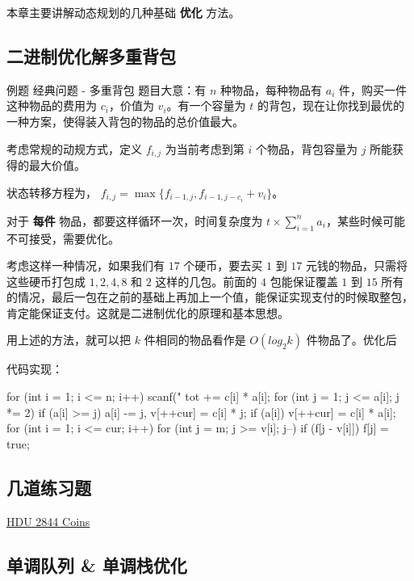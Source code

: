 
本章主要讲解动态规划的几种基础 \textbf{ 优化 } 方法。

\subsection{二进制优化解多重背包}

\begin{NOTE}{例题  经典问题 - 多重背包}{}
题目大意：有 $n$ 种物品，每种物品有 $a_i$ 件，购买一件这种物品的费用为 $c_i$，价值为 $v_i$。有一个容量为 $t$ 的背包，现在让你找到最优的一种方案，使得装入背包的物品的总价值最大。

\end{NOTE}


考虑常规的动规方式，定义 $f_{i,j}$ 为当前考虑到第 $i$ 个物品，背包容量为 $j$ 所能获得的最大价值。

状态转移方程为， $f_{i,j}=\max\{f_{i-1,j},f_{i-1,j-c_i}+v_i\}$。

对于 \textbf{ 每件 } 物品，都要这样循环一次，时间复杂度为 $t\times \sum_{i=1}^n a_i$，某些时候可能不可接受，需要优化。

考虑这样一种情况，如果我们有 $17$ 个硬币，要去买 $1$ 到 $17$ 元钱的物品，只需将这些硬币打包成 $1,2,4,8$ 和 $2$ 这样的几包。前面的 $4$ 包能保证覆盖 $1$ 到 $15$ 所有的情况，最后一包在之前的基础上再加上一个值，能保证实现支付的时候取整包，肯定能保证支付。这就是二进制优化的原理和基本思想。

用上述的方法，就可以把 $k$ 件相同的物品看作是 $O(log_2 k)$ 件物品了。优化后

代码实现：

\begin{cppcode}
for (int i = 1; i <= n; i++) {
  scanf("%
  tot += c[i] * a[i];
  for (int j = 1; j <= a[i]; j *= 2)
    if (a[i] >= j) a[i] -= j, v[++cur] = c[i] * j;
  if (a[i]) v[++cur] = c[i] * a[i];
}
for (int i = 1; i <= cur; i++)
  for (int j = m; j >= v[i]; j--)
    if (f[j - v[i]]) f[j] = true;
\end{cppcode}

\subsection{几道练习题}

\href{http://acm.hdu.edu.cn/showproblem.php?pid=2844}{HDU 2844 Coins}

\subsection{单调队列 \& 单调栈优化}

